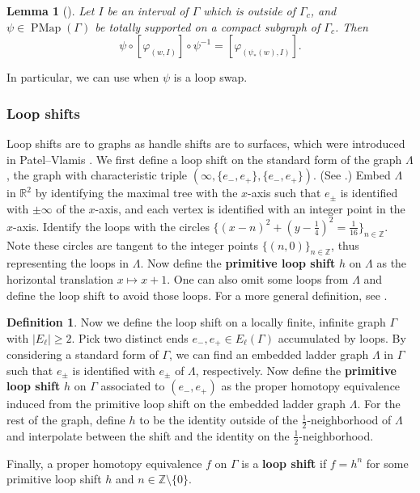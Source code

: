 \documentclass[11pt]{amsart}
\theoremstyle{plain}
\newtheorem{LEM}[THM]{Lemma}
\theoremstyle{definition}
\newtheorem{DEF}[THM]{Definition}
\DeclareMathOperator{\PMap}{PMap}
\newcommand{\Z}{\mathbb{Z}}
\newcommand{\R}{\mathbb{R}}
\def\G{{\Gamma}}
\newcommand{\<}{\langle}
\renewcommand{\>}{\rangle}
\begin{document}
    \begin{LEM}[{\cite[Lemma 3.10]{DHK2023}}] \label{lem:conjugationLaw}
        Let $I$ be an interval of $\G$ which is outside of $\G_c$, and $\psi \in \PMap(\G)$ be totally supported on a compact subgraph of $\G_{c}$. Then
        \[
            \psi \circ [\varphi_{(w,I)}] \circ \psi^{-1} = [\varphi_{(\psi_*(w),I)}].
        \]
    \end{LEM}
    In particular, we can use  when $\psi$ is a loop swap.

\subsubsection{Loop shifts}
Loop shifts are to graphs as handle shifts are to surfaces, which were introduced in Patel--Vlamis \cite{PatelVlamis}. We first define a loop shift on the standard form of the graph $\Lambda$, the graph with characteristic triple $(\infty, \{e_{-},e_{+}\},\{e_{-},e_{+}\})$. (See .) Embed $\Lambda$ in $\R^2$ by identifying the maximal tree with the $x$-axis such that $e_{\pm}$ is identified with $\pm \infty$ of the $x$-axis, and each vertex is identified with an integer point in the $x$-axis. Identify the loops with the circles $\{(x-n)^2 + (y-\frac{1}{4})^2 = \frac{1}{16}\}_{n \in \Z}$. Note these circles are tangent to the integer points $\{(n,0)\}_{n \in \Z}$, thus representing the loops in $\Lambda$. Now define the \textbf{primitive loop shift} $h$ on $\Lambda$ as the horizontal translation $x \mapsto x+1$. One can also omit some loops from $\Lambda$ and define the loop shift to avoid those loops. For a more general definition, see \cite[Section 3.4]{DHK2023}.

\begin{DEF}
Now we define the loop shift on a locally finite, infinite graph $\G$ with $|E_\ell| \ge 2$. Pick two distinct ends $e_{-}, e_+ \in E_\ell(\G)$ accumulated by loops. By considering a standard form of $\G$, we can find an embedded ladder graph $\Lambda$ in $\G$ such that $e_{\pm}$ is identified with $e_{\pm}$ of $\Lambda$, respectively. Now define the \textbf{primitive loop shift} $h$ on $\G$ associated to $(e_-, e_+)$ as the proper homotopy equivalence induced from the primitive loop shift on the embedded ladder graph $\Lambda$. For the rest of the graph, define $h$ to be the identity outside of the $\frac{1}{2}$-neighborhood of $\Lambda$ and interpolate between the shift and the identity on the $\frac{1}{2}$-neighborhood.

Finally, a proper homotopy equivalence $f$ on $\G$ is a \textbf{loop shift} if $f = h^n$ for some primitive loop shift $h$ and $n \in \Z \setminus \{0\}$.
\end{DEF} 
\end{document}
